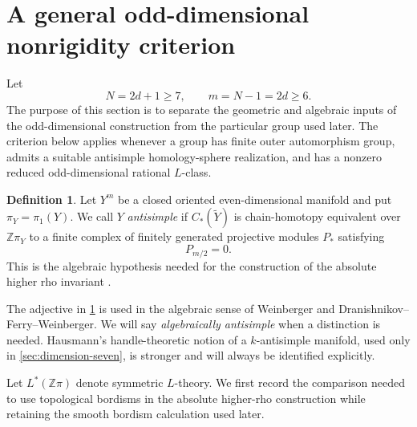\documentclass[10pt,reqno]{amsart}
\numberwithin{equation}{section}
\theoremstyle{definition}
\newtheorem{definition}{Definition}
\theoremstyle{remark}
\newcommand{\Z}{\mathbb Z}
\begin{document}
\section{A general odd-dimensional nonrigidity criterion}
\label{sec:odd-general-criterion}

Let
\[
N=2d+1\geq7,
\qquad
m=N-1=2d\geq6.
\]
The purpose of this section is to separate the geometric and
algebraic inputs of the odd-dimensional construction from the
particular group used later.  The criterion below applies whenever a
group has finite outer automorphism group, admits a suitable
antisimple homology-sphere realization, and has a nonzero reduced
odd-dimensional rational \(L\)-class.

\begin{definition}\label{def:antisimple}
Let \(Y^m\) be a closed oriented even-dimensional manifold and put
\(\pi_Y=\pi_1(Y)\).  We call \(Y\) \emph{antisimple} if
\(C_*(\widetilde Y)\) is chain-homotopy equivalent over
\(\Z\pi_Y\) to a finite complex of finitely generated projective
modules \(P_*\) satisfying
\[
P_{m/2}=0.
\]
This is the algebraic hypothesis needed for the construction of the
absolute higher rho invariant \cite{WeinbergerRho,DFW}.
\end{definition}

The adjective in \cref{def:antisimple} is used in the algebraic sense
of Weinberger and Dranishnikov--Ferry--Weinberger.  We will say
\emph{algebraically antisimple} when a distinction is needed.
Hausmann's handle-theoretic notion of a \(k\)-antisimple manifold,
used only in \cref{sec:dimension-seven}, is stronger and will always
be identified explicitly.

Let \(L^*(\Z\pi)\) denote symmetric \(L\)-theory.  We first
record the comparison needed to use topological bordisms in the
absolute higher-rho construction while retaining the smooth bordism
calculation used later.
\end{document}
